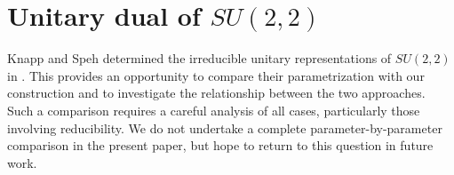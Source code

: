\documentclass[twoside,a4paper,12pt]{article}
\theoremstyle{definition}
\begin{document}
\section{Unitary dual of $SU(2,2)$}

Knapp and Speh determined the irreducible unitary representations of
$SU(2,2)$ in \cite{KnappSpeh1982}. This provides an opportunity to compare
their parametrization with our construction and to investigate the
relationship between the two approaches. Such a comparison requires a careful
analysis of all cases, particularly those involving reducibility. We do not
undertake a complete parameter-by-parameter comparison in the present paper,
but hope to return to this question in future work.







 

\end{document}
